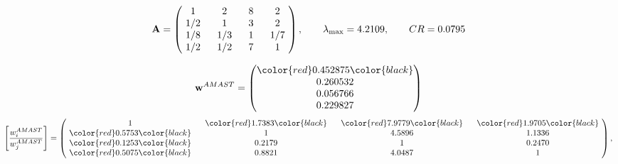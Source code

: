 \begin{example}
\begin{equation*}
\mathbf{A} =
\begin{pmatrix}
$\,\,$ 1 $\,\,$ & $\,\,$2$\,\,$ & $\,\,$8$\,\,$ & $\,\,$2 $\,\,$ \\
$\,\,$ 1/2$\,\,$ & $\,\,$ 1 $\,\,$ & $\,\,$3$\,\,$ & $\,\,$2 $\,\,$ \\
$\,\,$ 1/8$\,\,$ & $\,\,$ 1/3$\,\,$ & $\,\,$ 1 $\,\,$ & $\,\,$ 1/7 $\,\,$ \\
$\,\,$ 1/2$\,\,$ & $\,\,$ 1/2$\,\,$ & $\,\,$7$\,\,$ & $\,\,$ 1  $\,\,$ \\
\end{pmatrix},
\qquad
\lambda_{\max} =
4.2109,
\qquad
CR = 0.0795
\end{equation*}

\begin{equation*}
\mathbf{w}^{AMAST} =
\begin{pmatrix}
\color{red} 0.452875\color{black} \\
0.260532\\
0.056766\\
0.229827
\end{pmatrix}\end{equation*}
\begin{equation*}
\left[ \frac{{w}^{AMAST}_i}{{w}^{AMAST}_j} \right] =
\begin{pmatrix}
$\,\,$ 1 $\,\,$ & $\,\,$\color{red} 1.7383\color{black} $\,\,$ & $\,\,$\color{red} 7.9779\color{black} $\,\,$ & $\,\,$\color{red} 1.9705\color{black} $\,\,$ \\
$\,\,$\color{red} 0.5753\color{black} $\,\,$ & $\,\,$ 1 $\,\,$ & $\,\,$4.5896$\,\,$ & $\,\,$1.1336  $\,\,$ \\
$\,\,$\color{red} 0.1253\color{black} $\,\,$ & $\,\,$0.2179$\,\,$ & $\,\,$ 1 $\,\,$ & $\,\,$0.2470 $\,\,$ \\
$\,\,$\color{red} 0.5075\color{black} $\,\,$ & $\,\,$0.8821$\,\,$ & $\,\,$4.0487$\,\,$ & $\,\,$ 1  $\,\,$ \\
\end{pmatrix},
\end{equation*}


\end{example}
